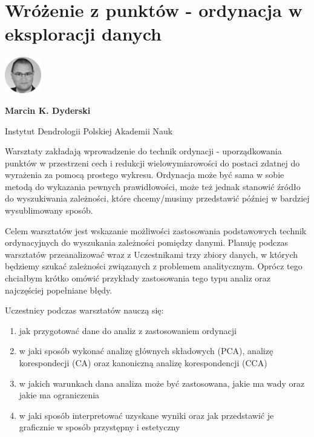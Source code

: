 \documentclass[\main/boa.tex]{subfiles}
\begin{document}
\section{Wróżenie z punktów - ordynacja w eksploracji danych}
\begin{minipage}[t]{0.915\textwidth}
	\center     
    \includegraphics[width=60px]{img/workshops/czarno_biale/mdyderski_crop.png} 
\end{minipage}

\begin{minipage}{0.915\textwidth}
\centering
{\bf {} Marcin K. Dyderski}
\end{minipage}

\vskip 0.3cm

\begin{affiliations}
\begin{minipage}{0.915\textwidth}
\centering
\large Instytut Dendrologii Polskiej Akademii Nauk  \\[2pt]
\end{minipage}
\end{affiliations}

\vskip 0.8cm

\opiswarsztatu Warsztaty zakładają wprowadzenie do technik ordynacji - uporządkowania punktów w przestrzeni cech i redukcji wielowymiarowości do postaci zdatnej do wyrażenia za pomocą prostego wykresu. Ordynacja może być sama w sobie metodą do wykazania pewnych prawidłowości, może też jednak stanowić źródło do wyszukiwania zależności, które chcemy/musimy przedstawić później w bardziej wysublimowany sposób.

Celem warsztatów jest wskazanie możliwości zastosowania podstawowych technik ordynacyjnych do wyszukania zależności pomiędzy danymi. Planuję podczas warsztatów przeanalizować wraz z Uczestnikami trzy zbiory danych, w których będziemy szukać zależności związanych z problemem analitycznym. Oprócz tego chciałbym krótko omówić przykłady zastosowania tego typu analiz oraz najczęściej popełniane błędy.

Uczestnicy podczas warsztatów nauczą się:
\begin{enumerate}
\item jak przygotować dane do analiz z zastosowaniem ordynacji
\item w jaki sposób wykonać analizę głównych składowych (PCA), analizę korespondecji (CA) oraz kanoniczną analizę korespondencji (CCA)
\item w jakich warunkach dana analiza może być zastosowana, jakie ma wady oraz jakie ma ograniczenia
\item w jaki sposób interpretować uzyskane wyniki oraz jak przedstawić je graficznie w sposób przystępny i estetyczny
\end{enumerate}
\end{document}
